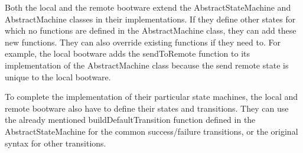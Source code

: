 Both the local and the remote bootware extend the AbstractStateMachine and AbstractMachine classes in their implementations.
If they define other states for which no functions are defined in the AbstractMachine class, they can add these new functions.
They can also override existing functions if they need to.
For example, the local bootware adds the sendToRemote function to its implementation of the AbstractMachine class because the send remote state is unique to the local bootware.

To complete the implementation of their particular state machines, the local and remote bootware also have to define their states and transitions.
They can use the already mentioned buildDefaultTransition function defined in the AbstractStateMachine for the common success/failure transitions, or the original syntax for other transitions.
